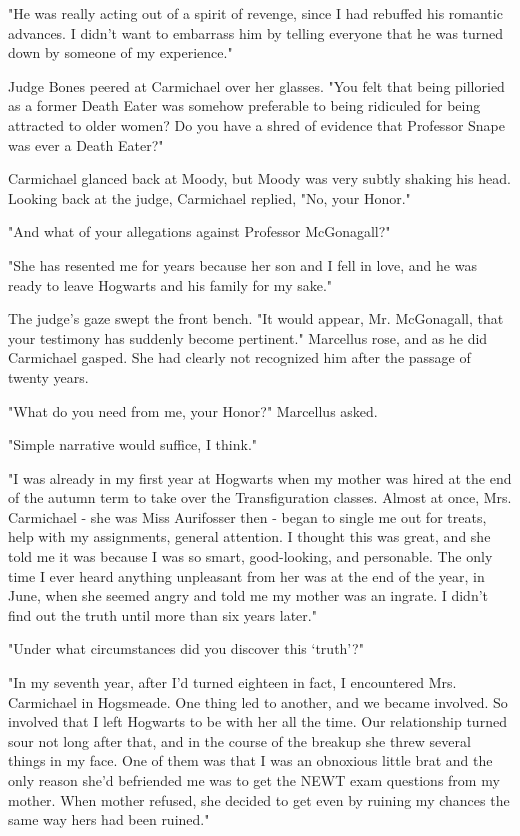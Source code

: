 \documentclass[a4paper,11pt]{article}
\begin{document}
"He was really acting out of a spirit of revenge, since I had rebuffed his romantic advances. I didn't want to embarrass him by telling everyone that he was turned down by someone of my experience."

Judge Bones peered at Carmichael over her glasses. "You felt that being pilloried as a former Death Eater was somehow preferable to being ridiculed for being attracted to older women? Do you have a shred of evidence that Professor Snape was ever a Death Eater?"

Carmichael glanced back at Moody, but Moody was very subtly shaking his head. Looking back at the judge, Carmichael replied, "No, your Honor."

"And what of your allegations against Professor McGonagall?"

"She has resented me for years because her son and I fell in love, and he was ready to leave Hogwarts and his family for my sake."

The judge's gaze swept the front bench. "It would appear, Mr. McGonagall, that your testimony has suddenly become pertinent." Marcellus rose, and as he did Carmichael gasped. She had clearly not recognized him after the passage of twenty years.

"What do you need from me, your Honor?" Marcellus asked.

"Simple narrative would suffice, I think."

"I was already in my first year at Hogwarts when my mother was hired at the end of the autumn term to take over the Transfiguration classes. Almost at once, Mrs. Carmichael - she was Miss Aurifosser then - began to single me out for treats, help with my assignments, general attention. I thought this was great, and she told me it was because I was so smart, good-looking, and personable. The only time I ever heard anything unpleasant from her was at the end of the year, in June, when she seemed angry and told me my mother was an ingrate. I didn't find out the truth until more than six years later."

"Under what circumstances did you discover this `truth'?"

"In my seventh year, after I'd turned eighteen in fact, I encountered Mrs. Carmichael in Hogsmeade. One thing led to another, and we became involved. So involved that I left Hogwarts to be with her all the time. Our relationship turned sour not long after that, and in the course of the breakup she threw several things in my face. One of them was that I was an obnoxious little brat and the only reason she'd befriended me was to get the NEWT exam questions from my mother. When mother refused, she decided to get even by ruining my chances the same way hers had been ruined."
\end{document}
